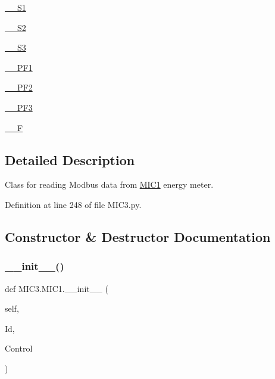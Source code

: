 \begin{DoxyCompactItemize}
\hyperlink{class_m_i_c3_1_1_m_i_c1_a6bcbbf706089333c946aa4965af8e656}{\+\_\+\+\_\+\+S1}
\item 
\hyperlink{class_m_i_c3_1_1_m_i_c1_ab89d273cd8a7d1f0fe67a701e9e54f82}{\+\_\+\+\_\+\+S2}
\item 
\hyperlink{class_m_i_c3_1_1_m_i_c1_af5f14575962daa8e627bc9fdf673b253}{\+\_\+\+\_\+\+S3}
\item 
\hyperlink{class_m_i_c3_1_1_m_i_c1_a2eb1458e0c349707753186002063859b}{\+\_\+\+\_\+\+P\+F1}
\item 
\hyperlink{class_m_i_c3_1_1_m_i_c1_a6bd93a47ffd2e1440f00ea82e1b26f65}{\+\_\+\+\_\+\+P\+F2}
\item 
\hyperlink{class_m_i_c3_1_1_m_i_c1_a0cedb48c21b85171b2f8f316afa59a85}{\+\_\+\+\_\+\+P\+F3}
\item 
\hyperlink{class_m_i_c3_1_1_m_i_c1_ac24e1bb43a234d3545bd9dea897ee7f8}{\+\_\+\+\_\+F}
\end{DoxyCompactItemize}


\subsection{Detailed Description}
Class for reading Modbus data from \hyperlink{class_m_i_c3_1_1_m_i_c1}{M\+I\+C1} energy meter. 

Definition at line 248 of file M\+I\+C3.\+py.



\subsection{Constructor \& Destructor Documentation}
\mbox{\label{class_m_i_c3_1_1_m_i_c1_a4da84973f93568b4d4434906a2290d39}} 
\subsubsection{\texorpdfstring{\+\_\+\+\_\+init\+\_\+\+\_\+()}{\_\_init\_\_()}}
{\footnotesize\ttfamily def M\+I\+C3.\+M\+I\+C1.\+\_\+\+\_\+init\+\_\+\+\_\+ (\begin{DoxyParamCaption}\item[{}]{self,  }\item[{}]{Id,  }\item[{}]{Control }\end{DoxyParamCaption})}



